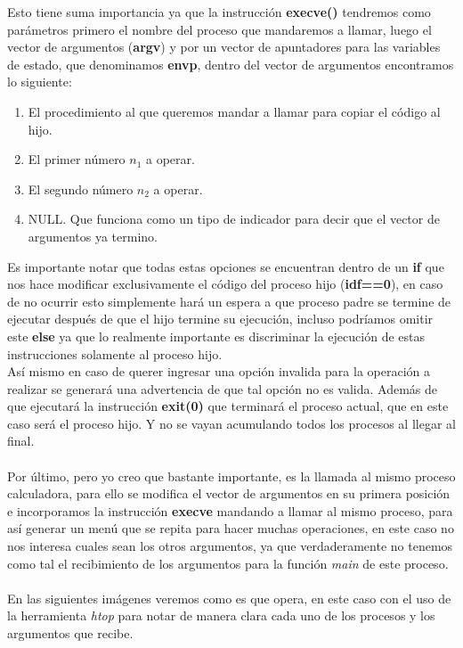 \documentclass[10pt]{article}
\begin{document}
	\newpage
	Esto tiene suma importancia ya que la instrucción \textbf{execve()} tendremos como parámetros primero el nombre del proceso que mandaremos a llamar, luego el vector de argumentos (\textbf{argv}) y por un vector de apuntadores para las variables de estado, que denominamos \textbf{envp}, dentro del vector de argumentos encontramos lo siguiente: 
	\begin{enumerate}
		\item El procedimiento al que queremos mandar a llamar para copiar el código al hijo. 
		\item El primer número $n_1$ a operar. 
		\item El segundo número $n_2$ a operar. 
		\item NULL. Que funciona como un tipo de indicador para decir que el vector de argumentos ya termino. 
	\end{enumerate}
	Es importante notar que todas estas opciones se encuentran dentro de un \textbf{if} que nos hace modificar exclusivamente el código del proceso hijo (\textbf{idf==0}), en caso de no ocurrir esto simplemente hará un espera a que proceso padre se termine de ejecutar después de que el hijo termine su ejecución,  incluso podríamos omitir este \textbf{else} ya que lo realmente importante es discriminar la ejecución de estas instrucciones solamente al proceso hijo. 
	\\
	Así mismo en caso de querer ingresar una opción invalida para la operación a realizar se generará una advertencia de que tal opción no es valida. Además de que ejecutará la instrucción \textbf{exit(0)} que terminará el proceso actual, que en este caso será el proceso hijo. Y no se vayan acumulando todos los procesos al llegar al final. 
	\\\\
	Por último, pero yo creo que bastante importante, es la llamada al mismo proceso calculadora, para ello se modifica el vector de argumentos en su primera posición e incorporamos la instrucción \textbf{execve} mandando a llamar al mismo proceso, para así generar un menú que se repita para hacer muchas operaciones, en este caso no nos interesa cuales sean los otros argumentos, ya que verdaderamente no tenemos como tal el recibimiento de los argumentos para la función \emph{main} de este proceso. 
	\\\\
	En las siguientes imágenes veremos como es que opera, en este caso con el uso de la herramienta \emph{htop} para notar de manera clara cada uno de los procesos y los argumentos que recibe.
\end{document}
